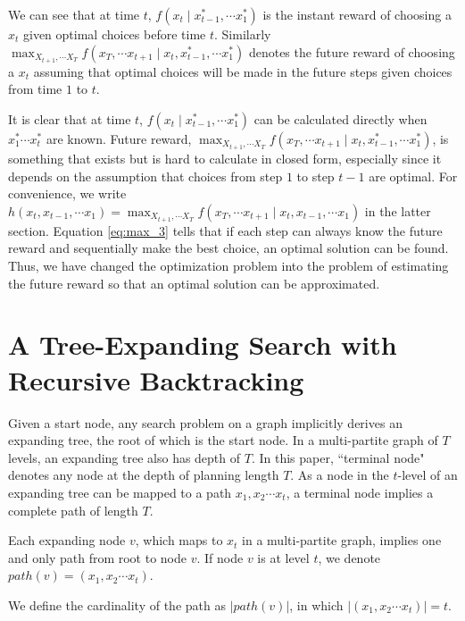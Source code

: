 \documentclass[12pt]{article}
\begin{document}
We can see that at time $ t $, 
$ f(x_{t} \mid x_{t-1}^{*}, \cdots x_{1}^{*}) $ is the instant reward of choosing a $ x_{t} $ given optimal choices before time $ t $. Similarly $ \max_{X_{t+1}, \cdots X_{T}} f(x_{T}, \cdots x_{t+1} \mid x_{t},  x_{t-1}^{*}, \cdots x_{1}^{*}) $ denotes the future reward of choosing a $ x_{t} $ assuming that optimal choices will be made in the future steps given choices from time $ 1 $ to $ t $.

It is clear that at time $ t $, $ f(x_{t} \mid x_{t-1}^{*}, \cdots x_{1}^{*}) $ can be calculated directly when $ x_{1}^{*} \cdots x_{t}^{*} $ are known. Future reward, $ \max_{X_{t+1}, \cdots X_{T}} f(x_{T}, \cdots x_{t+1} \mid x_{t},  x_{t-1}^{*}, \cdots x_{1}^{*}) $, is something that exists but is hard to calculate in closed form, especially since it depends on the assumption that choices from step $ 1 $ to step $ t-1 $ are optimal. For convenience, we write $ h(x_{t},  x_{t-1}, \cdots x_{1}) = \max_{X_{t+1}, \cdots X_{T}} f(x_{T}, \cdots x_{t+1} \mid x_{t},  x_{t-1}, \cdots x_{1}) $ in the latter section. Equation \ref{eq:max_3} tells that if each step can always know the future reward and sequentially make the best choice, an optimal solution can be found. Thus, we have changed the optimization problem into the problem of estimating the future reward so that an optimal solution can be approximated.

\section{A Tree-Expanding Search with Recursive Backtracking}

Given a start node, any search problem on a graph implicitly derives an expanding tree, the root of which is the start node. In a multi-partite graph of $ T $ levels, an expanding tree also has depth of $ T $. In this paper, ``terminal node" denotes any node at the depth of planning length $ T $. As a node in the $ t $-level of an expanding tree can be mapped to a path $ x_{1}, x_{2} \cdots x_{t} $, a terminal node implies a complete path of length $ T $. 

\begin{propty}
\label{prop:path}
Each expanding node $ v $, which maps to $ x_{t} $ in a multi-partite graph, implies one and only path from root to node $ v $. If node $ v $ is at level $ t $, we denote $ path(v) = ( x_{1}, x_{2} \cdots x_{t} )  $.
\end{propty}

We define the cardinality of the path as $ \left| path(v) \right| $, in which $ \left| ( x_{1}, x_{2} \cdots x_{t} ) \right| = t $.
\end{document}
